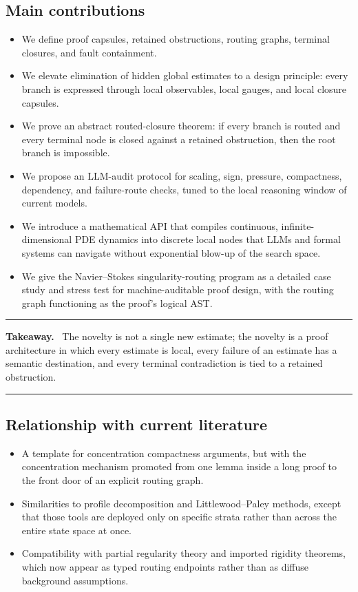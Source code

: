 \documentclass[11pt]{article}
\theoremstyle{plain}
\theoremstyle{definition}
\theoremstyle{remark}
\newcommand{\NS}{Navier--Stokes}
\newenvironment{takeaway}
{\par\medskip\noindent\begin{minipage}{\linewidth}\hrule\vspace{0.4em}\textbf{Takeaway.}\ }
{\vspace{0.4em}\hrule\end{minipage}\par\medskip}
\begin{document}
\subsection{Main contributions}
\begin{itemize}
  \item We define proof capsules, retained obstructions, routing graphs, terminal closures, and fault containment.
  \item We elevate elimination of hidden global estimates to a design principle: every branch is expressed through local observables, local gauges, and local closure capsules.
  \item We prove an abstract routed-closure theorem: if every branch is routed and every terminal node is closed against a retained obstruction, then the root branch is impossible.
  \item We propose an LLM-audit protocol for scaling, sign, pressure, compactness, dependency, and failure-route checks, tuned to the local reasoning window of current models.
  \item We introduce a mathematical API that compiles continuous, infinite-dimensional PDE dynamics into discrete local nodes that LLMs and formal systems can navigate without exponential blow-up of the search space.
  \item We give the \NS{} singularity-routing program as a detailed case study and stress test for machine-auditable proof design, with the routing graph functioning as the proof's logical AST.
\end{itemize}

\begin{takeaway}
The novelty is not a single new estimate; the novelty is a proof architecture in which every estimate is local, every failure of an estimate has a semantic destination, and every terminal contradiction is tied to a retained obstruction.
\end{takeaway}


\subsection{Relationship with current literature}
\begin{itemize}
  \item A template for concentration compactness arguments, but with the concentration mechanism promoted from one lemma inside a long proof to the front door of an explicit routing graph.
  \item Similarities to profile decomposition and Littlewood--Paley methods, except that those tools are deployed only on specific strata rather than across the entire state space at once.
  \item Compatibility with partial regularity theory and imported rigidity theorems, which now appear as typed routing endpoints rather than as diffuse background assumptions.
\end{itemize}
\end{document}
